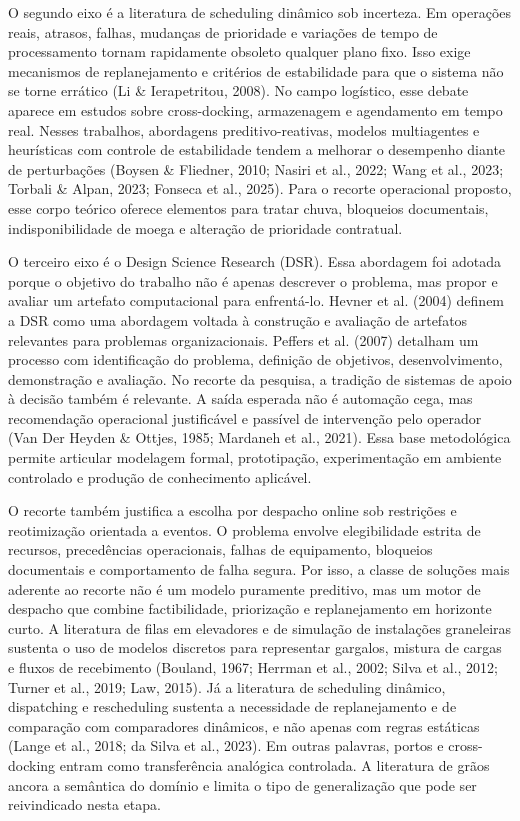 \documentclass[
  12pt,
  oneside,
  a4paper,
  sumario=tradicional,
  brazil
]{abntex2}
\begin{document}
O segundo eixo \'e a literatura de scheduling din\^amico sob incerteza. Em opera\c{c}\~oes reais, atrasos, falhas, mudan\c{c}as de prioridade e varia\c{c}\~oes de tempo de processamento tornam rapidamente obsoleto qualquer plano fixo. Isso exige mecanismos de replanejamento e crit\'erios de estabilidade para que o sistema n\~ao se torne err\'atico (Li \& Ierapetritou, 2008). No campo log\'istico, esse debate aparece em estudos sobre cross-docking, armazenagem e agendamento em tempo real. Nesses trabalhos, abordagens preditivo-reativas, modelos multiagentes e heur\'isticas com controle de estabilidade tendem a melhorar o desempenho diante de perturba\c{c}\~oes (Boysen \& Fliedner, 2010; Nasiri et al., 2022; Wang et al., 2023; Torbali \& Alpan, 2023; Fonseca et al., 2025). Para o recorte operacional proposto, esse corpo te\'orico oferece elementos para tratar chuva, bloqueios documentais, indisponibilidade de moega e altera\c{c}\~ao de prioridade contratual.

O terceiro eixo \'e o Design Science Research (DSR). Essa abordagem foi adotada porque o objetivo do trabalho n\~ao \'e apenas descrever o problema, mas propor e avaliar um artefato computacional para enfrent\'a-lo. Hevner et al. (2004) definem a DSR como uma abordagem voltada \`a constru\c{c}\~ao e avalia\c{c}\~ao de artefatos relevantes para problemas organizacionais. Peffers et al. (2007) detalham um processo com identifica\c{c}\~ao do problema, defini\c{c}\~ao de objetivos, desenvolvimento, demonstra\c{c}\~ao e avalia\c{c}\~ao. No recorte da pesquisa, a tradi\c{c}\~ao de sistemas de apoio \`a decis\~ao tamb\'em \'e relevante. A sa\'ida esperada n\~ao \'e automa\c{c}\~ao cega, mas recomenda\c{c}\~ao operacional justific\'avel e pass\'ivel de interven\c{c}\~ao pelo operador (Van Der Heyden \& Ottjes, 1985; Mardaneh et al., 2021). Essa base metodol\'ogica permite articular modelagem formal, prototipa\c{c}\~ao, experimenta\c{c}\~ao em ambiente controlado e produ\c{c}\~ao de conhecimento aplic\'avel.

O recorte tamb\'em justifica a escolha por despacho online sob restri\c{c}\~oes e reotimiza\c{c}\~ao orientada a eventos. O problema envolve elegibilidade estrita de recursos, preced\^encias operacionais, falhas de equipamento, bloqueios documentais e comportamento de falha segura. Por isso, a classe de solu\c{c}\~oes mais aderente ao recorte n\~ao \'e um modelo puramente preditivo, mas um motor de despacho que combine factibilidade, prioriza\c{c}\~ao e replanejamento em horizonte curto. A literatura de filas em elevadores e de simula\c{c}\~ao de instala\c{c}\~oes graneleiras sustenta o uso de modelos discretos para representar gargalos, mistura de cargas e fluxos de recebimento (Bouland, 1967; Herrman et al., 2002; Silva et al., 2012; Turner et al., 2019; Law, 2015). J\'a a literatura de scheduling din\^amico, dispatching e rescheduling sustenta a necessidade de replanejamento e de compara\c{c}\~ao com comparadores din\^amicos, e n\~ao apenas com regras est\'aticas (Lange et al., 2018; da Silva et al., 2023). Em outras palavras, portos e cross-docking entram como transfer\^encia anal\'ogica controlada. A literatura de gr\~aos ancora a sem\^antica do dom\'inio e limita o tipo de generaliza\c{c}\~ao que pode ser reivindicado nesta etapa.
\end{document}
